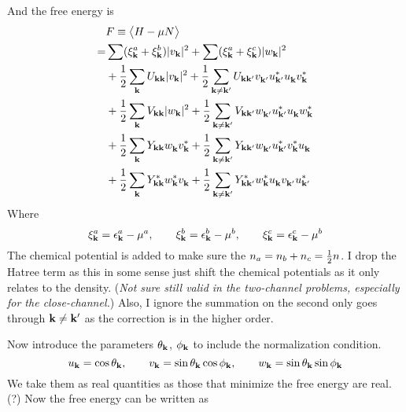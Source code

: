 And the free energy is 
\begin{equation}
 \begin{split}
  &F\equiv\bigl<{H-\mu{}N}\bigr>\\
    =&\sum(\xi^a_{\mathbf{k}}+\xi^b_{\mathbf{k}})\lvert{v_{\ensuremath{\mathbf{k}}}}\rvert^2+\sum(\xi^a_{\mathbf{k}}+\xi^c_{\mathbf{k}})\lvert{w_{\ensuremath{\mathbf{k}}}}\rvert^2\\
    &+\frac{1}{2}\sum_{\mathbf{k}}U_{\mathbf{k}\mathbf{k}}\lvert{v_{\ensuremath{\mathbf{k}}}}\rvert^2+\frac{1}{2}\sum_{\mathbf{k}\neq\mathbf{k}'}U_{\mathbf{k}\mathbf{k}'}v^{}_{\mathbf{k}'}u^*_{\mathbf{k}'}u^{}_{\mathbf{k}}{}v^*_{\mathbf{k}}\\
    &+\frac{1}{2}\sum_{\mathbf{k}}V_{\mathbf{k}\mathbf{k}}\lvert{w_{\ensuremath{\mathbf{k}}}}\rvert^2
      +\frac{1}{2}\sum_{\mathbf{k}\neq\mathbf{k}'}V_{\mathbf{k}\mathbf{k}'}w^{}_{\mathbf{k}'}u^*_{\mathbf{k}'}u^{}_{\mathbf{k}}{}w^*_{\mathbf{k}}\\
    &+\frac{1}{2}\sum_{\mathbf{k}}Y_{\mathbf{k}\mathbf{k}}w^{}_{\mathbf{k}}v^*_{\mathbf{k}}{}
      +\frac{1}{2}\sum_{\mathbf{k}\neq\mathbf{k}'}Y_{\mathbf{k}\mathbf{k}'}w^{}_{\mathbf{k}'}{u^{*}_{\mathbf{k}'}}v^*_{\mathbf{k}}{}u^{}_{\mathbf{k}}\\
    &+\frac{1}{2}\sum_{\mathbf{k}}Y^*_{\mathbf{k}\mathbf{k}}w^*_{\mathbf{k}}v^{}_{\mathbf{k}}{}
      +\frac{1}{2}\sum_{\mathbf{k}\neq\mathbf{k}'}Y^*_{\mathbf{k}\mathbf{k}'}w^*_{\mathbf{k}}{u^{}_{\mathbf{k}}}v^{}_{\mathbf{k}'}{}u^{*}_{\mathbf{k}'}
 \end{split}
\end{equation}
Where 
\begin{equation*}
 \xi^a_{\mathbf{k}}=\epsilon^a_{\mathbf{k}}-\mu^a,\qquad\xi^b_{\mathbf{k}}=\epsilon^b_{\mathbf{k}}-\mu^b,\qquad\xi^c_{\mathbf{k}}=\epsilon^c_{\mathbf{k}}-\mu^b
\end{equation*}
The chemical potential is added to make sure the $n_a=n_b+n_c=\frac{1}{2}n$.
 I drop the Hatree term as this in some sense just shift the chemical potentials as it only relates to the density.  (\emph{Not sure still valid in the two-channel problems, especially for the close-channel.})  Also, I ignore the summation on the second only goes through $\mathbf{k}\neq\mathbf{k}'$ as the correction is in the higher order. 
 
Now introduce the parameters $\theta_{\mathbf{k}}$, $\phi_{\mathbf{k}}$ to include the normalization condition.  
\begin{equation}
 u_{\mathbf{k}}=\cos\theta_{\mathbf{k}},\qquad{} v_{\mathbf{k}}=\sin\theta_{\mathbf{k}}\cos\phi_{\mathbf{k}},\qquad{}
 w_{\mathbf{k}}=\sin\theta_{\mathbf{k}}\sin\phi_{\mathbf{k}}
\end{equation}
We take them as real quantities as those that minimize the free energy are real.(?) Now the free energy can be written as 

